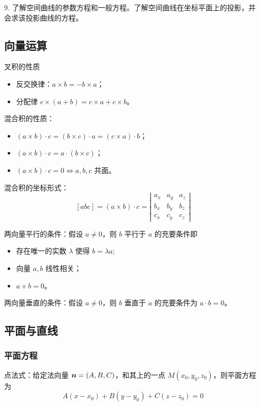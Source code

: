 9. 了解空间曲线的参数方程和一般方程。了解空间曲线在坐标平面上的投影，并会求该投影曲线的方程。

\subsection{向量运算}

叉积的性质
\begin{itemize}
	\item 反交换律：$a \times b = - b \times a$；
	\item 分配律 $c \times (a + b) = c \times a + c \times b$。
\end{itemize}

混合积的性质：
\begin{itemize}
	\item $(a \times b) \cdot c = (b \times c) \cdot a = (c \times a) \cdot b$；
	\item $(a \times b) \cdot c = a \cdot (b \times c)$；
	\item $(a \times b) \cdot c = 0 \Leftrightarrow a, b, c$ 共面。
\end{itemize}

混合积的坐标形式：
\[ [abc] = (a \times b) \cdot c = \left| \begin{matrix}
		a_x & a_y & a_z \\ b_x & b_y & b_z \\ c_x & c_y & c_z
	\end{matrix}\right| \]

两向量平行的条件：假设 $a \neq 0$，则 $b$ 平行于 $a$ 的充要条件即
\begin{itemize}
	\item 存在唯一的实数 $\lambda$ 使得 $b = \lambda a$;
	\item 向量 $a, b$ 线性相关；
	\item $a \times b = 0$。
\end{itemize}

两向量垂直的条件：假设 $a \neq 0$，则 $b$ 垂直于 $a$ 的充要条件为 $a \cdot b = 0$。

\subsection{平面与直线}

\subsubsection*{平面方程}

点法式：给定法向量 $\boldsymbol{n} = (A, B, C)$，和其上的一点 $M(x_0, y_0, z_0)$，则平面方程为
\[ A(x-x_0) + B(y-y_0) + C(z-z_0) = 0 \]

